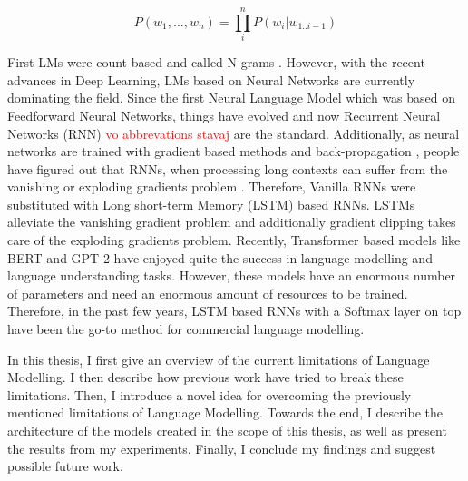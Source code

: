 \begin{displaymath}
    P(w_1, ..., w_n) = \prod_i^n P(w_i | w_{1..i-1})
\end{displaymath}

First LMs were count based and called N-grams \citep{martin2009speech}. However, with the recent advances in Deep Learning, LMs based on Neural Networks are currently dominating the field. Since the first Neural Language Model \citep{bengio2003neural} which was based on Feedforward Neural Networks, things have evolved and now Recurrent Neural Networks (RNN) \citep{mikolov2010recurrent} \textcolor{red}{vo abbrevations stavaj} are the standard. Additionally, as neural networks are trained with gradient based methods and back-propagation \citep{rumelhart1988learning}, people have figured out that RNNs, when processing long contexts can suffer from the vanishing or exploding gradients problem \citep{hochreiter1998vanishing, pascanu2012understanding, pascanu2013difficulty}. Therefore, Vanilla RNNs were substituted with Long short-term Memory (LSTM) \citep{hochreiter1997long} based RNNs. LSTMs alleviate the vanishing gradient problem and additionally gradient clipping \citep{pascanu2013difficulty} takes care of the exploding gradients problem. Recently, Transformer \citep{vaswani2017attention} based models like BERT \citep{devlin2018bert} and GPT-2 \citep{radford2019language} have enjoyed quite the success in language modelling and language understanding tasks. However, these models have an enormous number of parameters and need an enormous amount of resources to be trained. Therefore, in the past few years, LSTM based RNNs with a Softmax layer on top have been the go-to method for commercial language modelling.

In this thesis, I first give an overview of the current limitations of Language Modelling. I then describe how previous work have tried to break these limitations. Then, I introduce a novel idea for overcoming the previously mentioned limitations of Language Modelling. Towards the end, I describe the architecture of the models created in the scope of this thesis, as well as present the results from my experiments. Finally, I conclude my findings and suggest possible future work.
